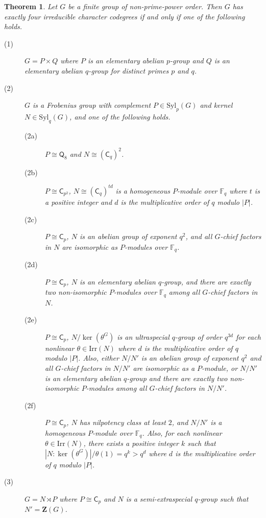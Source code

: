 \documentclass[9pt]{article}
\newtheorem{mainthm}{Theorem}
\begin{document}
\begin{mainthm}\label{thmA}
   Let $G$ be a finite group of non-prime-power order.
   Then $G$ has exactly four irreducible character codegrees if and only if one of the following holds.
   \begin{description}
	 \item[(1)] $G=P\times Q$ where $P$ is an elementary abelian $p$-group
       and $Q$ is an elementary abelian $q$-group for distinct primes $p$ and $q$.
      \item[(2)] $G$ is a Frobenius group with complement $P \in \mathrm{Syl}_{p}(G)$ and kernel $N\in \mathrm{Syl}_{q}(G)$,
	   and one of the following holds.
	  \begin{description}
		\item[(2a)] $P\cong \mathsf{Q}_8$ and $N\cong (\mathsf{C}_{q})^{2}$.
		\item[(2b)] $P\cong \mathsf{C}_{p^{2}}$, $N\cong (\mathsf{C}_{q})^{td}$ is a homogeneous $P$-module over $\mathbb{F}_q$ where
		 $t$ is a positive integer and $d$ is the multiplicative order of $q$ modulo $|P|$.
		 \item[(2c)] $P\cong \mathsf{C}_{p}$, $N$ is an abelian group of exponent $q^{2}$, and all $G$-chief factors in $N$ are isomorphic as $P$-modules over $\mathbb{F}_q$.
		 \item[(2d)] $P\cong \mathsf{C}_{p}$, $N$ is an elementary abelian $q$-group, and there are exactly two non-isomorphic $P$-modules over $\mathbb{F}_q$ among all $G$-chief factors in $N$. 
		 \item[(2e)] $P\cong \mathsf{C}_{p}$, $N/\ker(\theta^{G})$ is an ultraspecial $q$-group of order $q^{3d}$ for each nonlinear $\theta\in \mathrm{Irr}(N)$ where $d$ is the multiplicative order of $q$ modulo $|P|$.
		 Also, either $N/N'$
			is an abelian group of exponent $q^{2}$ and all $G$-chief factors in $N/N'$ are isomorphic as a $P$-module,
            or $N/N'$ is an elementary abelian $q$-group and there are exactly two non-isomorphic $P$-modules among all $G$-chief factors in $N/N'$.
		 \item[(2f)] $P\cong \mathsf{C}_{p}$, $N$ has nilpotency class at least $2$, and $N/N'$ is a homogeneous $P$-module over $\mathbb{F}_q$. Also, for each nonlinear $\theta\in \mathrm{Irr}(N)$, 
		 there exists a positive integer $k$ such that
		 $|N:\ker(\theta^G)|/\theta(1)=q^{k}>q^{d}$ where $d$ is the multiplicative order of $q$ modulo $|P|$.
	  \end{description}
	  \item[(3)] $G=N \rtimes P$ where $P\cong \mathsf{C}_{p}$ and $N$ is a semi-extraspecial $q$-group such that $N'=\mathbf{Z}(G)$. 

\end{description}
\end{mainthm}
\end{document}
